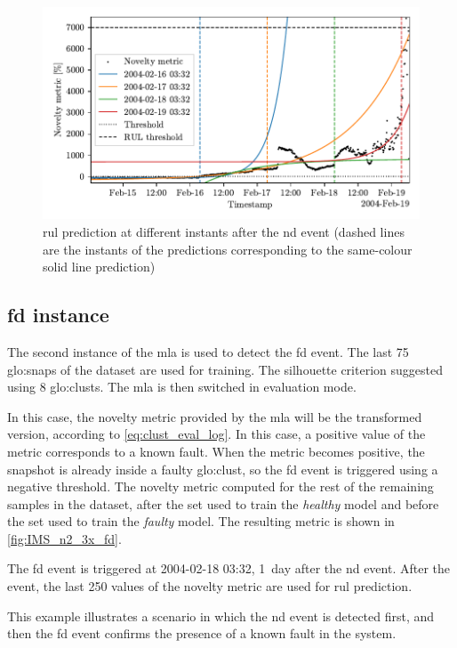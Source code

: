 \begin{figure}
    \centering
    \includegraphics[width=\textwidth]{images/IMS/Test02/RUL.pdf}
    \caption{\gls{rul} prediction at different instants after the \gls{nd} event (dashed lines are the instants of the predictions corresponding to the same-colour solid line prediction)}
    \label{fig:IMS_n2_3x_prediction}
\end{figure}

\subsection{\gls{fd} instance}
The second instance of the \gls{mla} is used to detect the \gls{fd} event. The last 75 \gls{glo:snap}s of the dataset are used for training. The silhouette criterion suggested using 8 \gls{glo:clust}s. The \gls{mla} is then switched in evaluation mode. 

In this case, the novelty metric provided by the \gls{mla} will be the transformed version, according to \autoref{eq:clust_eval_log}. In this case, a positive value of the metric corresponds to a known fault. When the metric becomes positive, the snapshot is already inside a faulty \gls{glo:clust}, so the \gls{fd} event is triggered using a negative threshold. The novelty metric computed for the rest of the remaining samples in the dataset, after the set used to train the \emph{healthy} model and before the set used to train the \emph{faulty} model. The resulting metric is shown in \autoref{fig:IMS_n2_3x_fd}.

The \gls{fd} event is triggered at 2004-02-18 03:32, 1~day after the \gls{nd} event. After the event, the last 250 values of the novelty metric are used for \gls{rul} prediction. 

This example illustrates a scenario in which the \gls{nd} event is detected first, and then the \gls{fd} event confirms the presence of a known fault in the system.

